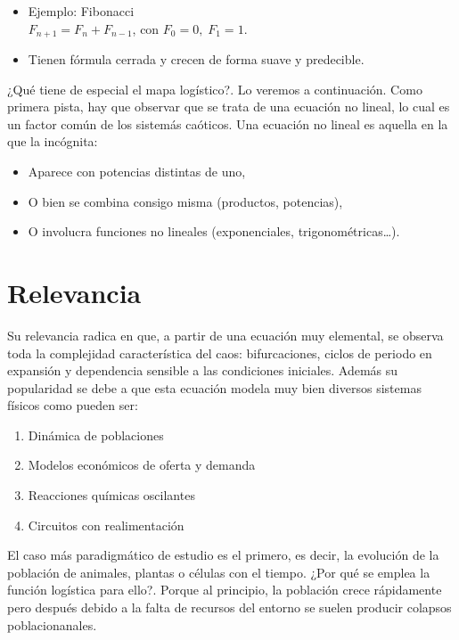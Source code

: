 \documentclass[
  11pt,
  a4paper,
  DIV=11,
  numbers=noendperiod]{scrreprt}
\providecommand{\tightlist}{%
  \setlength{\itemsep}{0pt}\setlength{\parskip}{0pt}}
\begin{document}
\begin{itemize}
\tightlist
\item
  Ejemplo: Fibonacci\\
  \(F_{n+1} = F_n + F_{n-1}\), con \(F_0=0,\;F_1=1\).\\
\item
  Tienen fórmula cerrada y crecen de forma suave y predecible.
\end{itemize}

¿Qué tiene de especial el mapa logístico?. Lo veremos a continuación.
Como primera pista, hay que observar que se trata de una ecuación no
lineal, lo cual es un factor común de los sistemás caóticos. Una
ecuación no lineal es aquella en la que la incógnita:

\begin{itemize}
\tightlist
\item
  Aparece con potencias distintas de uno,
\item
  O bien se combina consigo misma (productos, potencias),
\item
  O involucra funciones no lineales (exponenciales,
  trigonométricas\ldots).
\end{itemize}

\section{Relevancia}\label{relevancia}

Su relevancia radica en que, a partir de una ecuación muy elemental, se
observa toda la complejidad característica del caos: bifurcaciones,
ciclos de periodo en expansión y dependencia sensible a las condiciones
iniciales. Además su popularidad se debe a que esta ecuación modela muy
bien diversos sistemas físicos como pueden ser:

\begin{enumerate}
\def\labelenumi{\arabic{enumi}.}
\tightlist
\item
  Dinámica de poblaciones
\item
  Modelos económicos de oferta y demanda
\item
  Reacciones químicas oscilantes
\item
  Circuitos con realimentación
\end{enumerate}

El caso más paradigmático de estudio es el primero, es decir, la
evolución de la población de animales, plantas o células con el tiempo.
¿Por qué se emplea la función logística para ello?. Porque al principio,
la población crece rápidamente pero después debido a la falta de
recursos del entorno se suelen producir colapsos poblacionanales.
\end{document}

